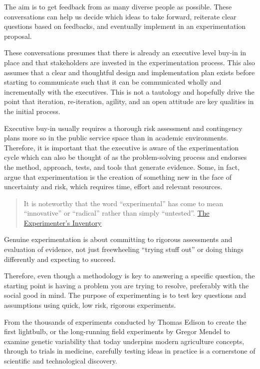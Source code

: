 \documentclass[openany]{book}
\begin{document}
The aim is to get feedback from as many diverse people as possible. These conversations can help us decide which ideas to take forward, reiterate clear questions based on feedbacks, and eventually implement in an experimentation proposal.

These conversations presumes that there is already an executive level buy-in in place and that stakeholders are invested in the experimentation process. This also assumes that a clear and thoughtful design and implementation plan exists before starting to communicate such that it can be communicated wholly and incrementally with the executives. This is not a tautology and hopefully drive the point that iteration, re-iteration, agility, and an open attitude are key qualities in the initial process.

Executive buy-in usually requires a thorough risk assessment and contingency plans more so in the public service space than in academic environments. Therefore, it is important that the executive is aware of the experimentation cycle which can also be thought of as the problem-solving process and endorses the method, approach, tests, and tools that generate evidence. Some, in fact, argue that experimentation is the creation of something new in the face of uncertainty and risk, which requires time, effort and relevant resources.

\begin{quote}
It is noteworthy that the word ``experimental'' has come to mean ``innovative'' or ``radical'' rather than simply ``untested''. \href{A\%20catalogue\%20of\%20experiments\%20for\%20decision-makers\%20and\%20professionals}{The Experimenter's Inventory}
\end{quote}

Genuine experimentation is about committing to rigorous assessments and evaluation of evidence, not just freewheeling ``trying stuff out'' or doing things differently and expecting to succeed.

Therefore, even though a methodology is key to answering a specific question, the starting point is having a problem you are trying to resolve, preferably with the social good in mind. The purpose of experimenting is to test key questions and assumptions using quick, low risk, rigorous experiments.

From the thousands of experiments conducted by Thomas Edison to create the first lightbulb, or the long-running field experiments by Gregor Mendel to examine genetic variability that today underpins modern agriculture concepts, through to trials in medicine, carefully testing ideas in practice is a cornerstone of scientific and technological discovery.
\end{document}
